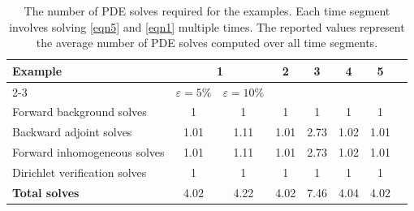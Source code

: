 \documentclass[onefignum,onetabnum]{siamart190516}
\numberwithin{equation}{section}
\begin{document}
\begin{table}[hbt!]
\centering
\begin{threeparttable}
\caption{The number of PDE solves required for the examples.
Each time segment involves solving \eqref{eqn5} and \eqref{eqn1} multiple times.
The reported values represent the average number of PDE solves computed over all time segments.}\label{table1}

\begin{tabular}{l|c c|c|c|c|c|c|}
\toprule
\textbf{Example} & \multicolumn{2}{c|}{1} & {2} & {3} & {4} & {5} \\
\cline{2-3}
& $\varepsilon = 5\%$ & $\varepsilon = 10\%$& &  & & \\
\hline
Forward background solves &1&1 & {1} & {1} & 1 & 1\\
Backward adjoint solves &1.01&1.11  & {1.01} & {2.73} & 1.02 & 1.01\\
Forward inhomogeneous solves &1.01&1.11  & {1.01} & {2.73} & 1.02 & 1.01 \\
Dirichlet verification solves &1&1  & {1} & {1} & 1 & 1\\
\hline
\textbf{Total solves} &4.02&4.22 & {4.02} & {7.46} & 4.04 & 4.02\\
\bottomrule
\end{tabular}
\end{threeparttable}
\end{table}
\end{document}
